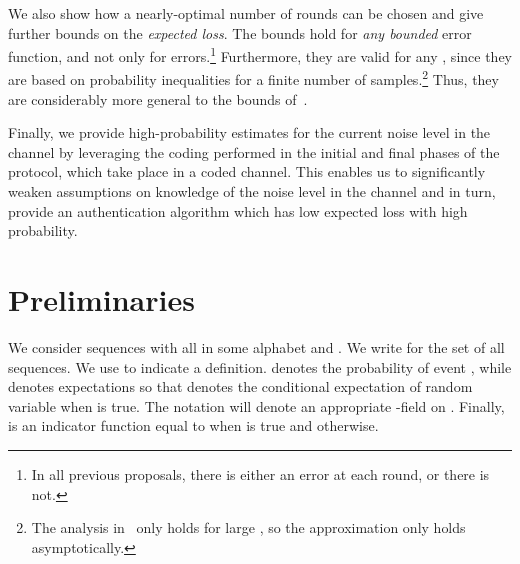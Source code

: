 \documentclass[a4paper]{article}
\theoremstyle{plain} \newtheorem{remark}{Remark}
\theoremstyle{plain} \newtheorem{definition}{Definition}
\theoremstyle{plain} \newtheorem{example}{Example}
\theoremstyle{plain} \newtheorem{assumption}{Assumption}
\theoremstyle{plain} \newtheorem{conjecture}{Conjecture}
\theoremstyle{plain} \newtheorem{theorem}{Theorem}
\theoremstyle{plain} \newtheorem{proposition}{Proposition}
\theoremstyle{plain} \newtheorem{lemma}{Lemma}
\theoremstyle{plain} \newtheorem{corollary}{Corollary}
\begin{document}
We also show how a nearly-optimal number of rounds  can be
chosen and give further bounds on the \textit{expected loss}.  The
bounds hold for {\em any bounded} error function, and not only for
 errors.\footnote{In all previous proposals, there is either
  an error at each round, or there is not.}  Furthermore, they are
valid for any , since they are based on probability inequalities
for a finite number of samples.\footnote{The analysis
  in~\cite{singelee2} only holds for large , so the approximation
  only holds asymptotically.} Thus, they are considerably more general
to the bounds of~\cite{singelee2}.

Finally, we provide high-probability estimates for the current noise
level in the channel by leveraging the coding performed in the initial
and final phases of the protocol, which take place in a coded
channel. This enables us to significantly weaken assumptions on
knowledge of the noise level in the channel and in turn, provide an
authentication algorithm which has low expected loss with high probability.









































\section{Preliminaries}
\label{sec:preliminaries}

We consider sequences  with all  in some
alphabet  and . We write  for the set of all sequences. 
We use  to indicate a definition.   denotes the
probability of event , while  denotes expectations so that
 denotes the
conditional expectation of random variable  when  is
true. The notation  will denote an appropriate
-field on . Finally,  is an indicator
function equal to  when  is true and  otherwise.
\end{document}

